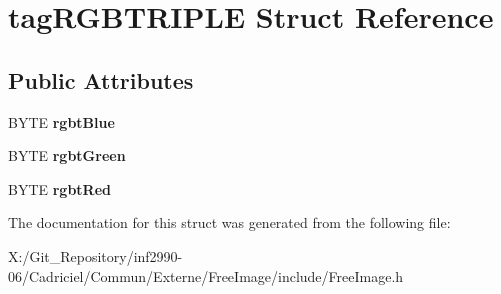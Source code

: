 \hypertarget{structtag_r_g_b_t_r_i_p_l_e}{\section{tag\-R\-G\-B\-T\-R\-I\-P\-L\-E Struct Reference}
\label{structtag_r_g_b_t_r_i_p_l_e}
}
\subsection*{Public Attributes}
\begin{DoxyCompactItemize}
\item 
\hypertarget{structtag_r_g_b_t_r_i_p_l_e_adbebf9e7802cdfffbdae31c08a71dab7}{B\-Y\-T\-E {\bfseries rgbt\-Blue}}\label{structtag_r_g_b_t_r_i_p_l_e_adbebf9e7802cdfffbdae31c08a71dab7}

\item 
\hypertarget{structtag_r_g_b_t_r_i_p_l_e_a2e3e106422819352693de65189cc341f}{B\-Y\-T\-E {\bfseries rgbt\-Green}}\label{structtag_r_g_b_t_r_i_p_l_e_a2e3e106422819352693de65189cc341f}

\item 
\hypertarget{structtag_r_g_b_t_r_i_p_l_e_ae61b0771fd3e1e267a3495dcfba5e21c}{B\-Y\-T\-E {\bfseries rgbt\-Red}}\label{structtag_r_g_b_t_r_i_p_l_e_ae61b0771fd3e1e267a3495dcfba5e21c}

\end{DoxyCompactItemize}


The documentation for this struct was generated from the following file\-:\begin{DoxyCompactItemize}
\item 
X\-:/\-Git\-\_\-\-Repository/inf2990-\/06/\-Cadriciel/\-Commun/\-Externe/\-Free\-Image/include/Free\-Image.\-h\end{DoxyCompactItemize}
